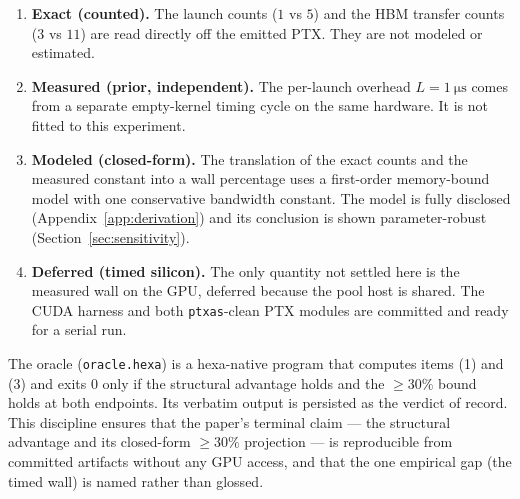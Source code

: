 \documentclass[11pt,a4paper]{article}
\begin{document}
\begin{enumerate}\itemsep0.3em
\item \textbf{Exact (counted).} The launch counts ($1$ vs $5$) and the HBM
  transfer counts ($3$ vs $11$) are read directly off the emitted PTX. They are
  not modeled or estimated.
\item \textbf{Measured (prior, independent).} The per-launch overhead
  $L=\SI{1}{\micro\second}$ comes from a separate empty-kernel timing cycle on
  the same hardware. It is not fitted to this experiment.
\item \textbf{Modeled (closed-form).} The translation of the exact counts and
  the measured constant into a wall percentage uses a first-order memory-bound
  model with one conservative bandwidth constant. The model is fully disclosed
  (Appendix~\ref{app:derivation}) and its conclusion is shown
  parameter-robust (Section~\ref{sec:sensitivity}).
\item \textbf{Deferred (timed silicon).} The only quantity not settled here is
  the measured wall on the GPU, deferred because the pool host is shared. The
  CUDA harness and both \texttt{ptxas}-clean PTX modules are committed and ready
  for a serial run.
\end{enumerate}

The oracle (\texttt{oracle.hexa}) is a hexa-native program that computes items
(1) and (3) and exits $0$ only if the structural advantage holds and the
$\ge 30\%$ bound holds at both endpoints. Its verbatim output is persisted as
the verdict of record. This discipline ensures that the paper's terminal claim
--- the structural advantage and its closed-form $\ge 30\%$ projection --- is
reproducible from committed artifacts without any GPU access, and that the one
empirical gap (the timed wall) is named rather than glossed.



\end{document}
